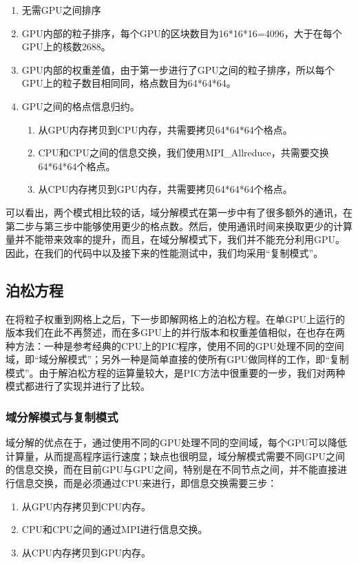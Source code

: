 \begin{enumerate}
  \item 无需GPU之间排序
  \item GPU内部的粒子排序，每个GPU的区块数目为16*16*16=4096，大于在每个GPU上的核数2688。
  \item GPU内部的权重差值，由于第一步进行了GPU之间的粒子排序，所以每个GPU上的粒子数目相同同，格点数目为64*64*64。
  \item GPU之间的格点信息归约。
  \begin{enumerate}
    \item 从GPU内存拷贝到CPU内存，共需要拷贝64*64*64个格点。
    \item CPU和CPU之间的信息交换，我们使用MPI\_Allreduce，共需要交换64*64*64个格点。
    \item 从CPU内存拷贝到GPU内存，共需要拷贝64*64*64个格点。
  \end{enumerate}
\end{enumerate}

可以看出，两个模式相比较的话，域分解模式在第一步中有了很多额外的通讯，在第二步与第三步中能够使用更少的格点数。然后，使用通讯时间来换取更少的计算量并不能带来效率的提升，而且，在域分解模式下，我们并不能充分利用GPU。因此，在我们的代码中以及接下来的性能测试中，我们均采用“复制模式”。

\subsection{泊松方程}
\label{section:PIC_GPU_Poisson}
在将粒子权重到网格上之后，下一步即解网格上的泊松方程。在单GPU上运行的版本我们在此不再赘述，而在多GPU上的并行版本和权重差值相似，在也存在两种方法：一种是参考经典的CPU上的PIC程序，使用不同的GPU处理不同的空间域，即“域分解模式”；另外一种是简单直接的使所有GPU做同样的工作，即“复制模式”。由于解泊松方程的运算量较大，是PIC方法中很重要的一步，我们对两种模式都进行了实现并进行了比较。

\subsubsection{域分解模式与复制模式}
域分解的优点在于，通过使用不同的GPU处理不同的空间域，每个GPU可以降低计算量，从而提高程序运行速度；缺点也很明显，域分解模式需要不同GPU之间的信息交换，而在目前GPU与GPU之间，特别是在不同节点之间，并不能直接进行信息交换，而是必须通过CPU来进行，即信息交换需要三步：
\begin{enumerate}
  \item 从GPU内存拷贝到CPU内存。
  \item CPU和CPU之间的通过MPI进行信息交换。
  \item 从CPU内存拷贝到GPU内存。
\end{enumerate}

